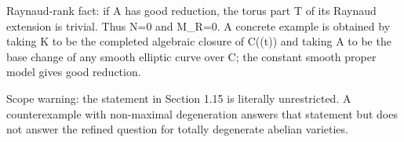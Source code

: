 Raynaud-rank fact: if A has good reduction, the torus part T of its Raynaud
extension is trivial.  Thus N=0 and M_R=0.  A concrete example is obtained by
taking K to be the completed algebraic closure of C((t)) and taking A to be
the base change of any smooth elliptic curve over C; the constant smooth
proper model gives good reduction.

Scope warning: the statement in Section 1.15 is literally unrestricted.  A
counterexample with non-maximal degeneration answers that statement but does
not answer the refined question for totally degenerate abelian varieties.
